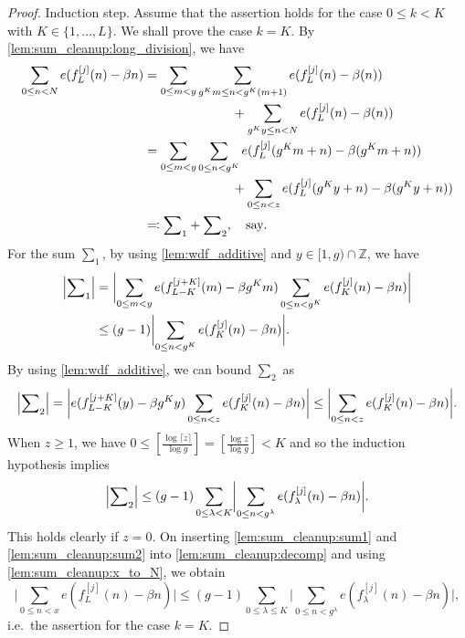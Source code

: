 \documentclass[hidelinks]{amsart}
\numberwithin{equation}{section}
\theoremstyle{plain}
\theoremstyle{definition}
\newcommand{\prooftitle}[1]{\noindent\textsf{#1}}
\begin{document}
\begin{proof}
\prooftitle{Induction step.}
Assume that the assertion holds for the case $0\le k<K$ with $K\in\{1,\ldots,L\}$.
We shall prove the case $k=K$.
By \cref{lem:sum_cleanup:long_division}, we have
\begin{equation}
\label{lem:sum_cleanup:decomp}
\begin{aligned}
\sum_{0\le n<N}
e(f_{L}^{[j]}(n)-\beta n)
&=
\sum_{0\le m<y}
\sum_{g^{K}m\le n<g^{K}(m+1)}
e(f_{L}^{[j]}(n)-\beta(n))\\
&\hspace{0.2\textwidth}
+
\sum_{g^{K}y\le n<N}
e(f_{L}^{[j]}(n)-\beta(n))\\
&=
\sum_{0\le m<y}
\sum_{0\le n<g^{K}}
e(f_{L}^{[j]}(g^{K}m+n)-\beta(g^{K}m+n))\\
&\hspace{0.2\textwidth}
+
\sum_{0\le n<z}
e(f_{L}^{[j]}(g^{K}y+n)-\beta(g^{K}y+n))\\
&\eqqcolon
{\sum}_{1}+{\sum}_{2},\quad\text{say}.
\end{aligned}
\end{equation}
For the sum ${\sum}_{1}$, by using \cref{lem:wdf_additive} and $y\in[1,g)\cap\mathbb{Z}$, we have
\begin{align}
\label{lem:sum_cleanup:sum1}
\Bigl|
{\sum}_{1}
\Bigr|
&=
\biggl|
\sum_{0\le m<y}
e(f_{L-K}^{[j+K]}(m)-\beta g^{K}m)
\sum_{0\le n<g^{K}}
e(f_{K}^{[j]}(n)-\beta n)
\biggr|\\
&\le
(g-1)
\biggl|
\sum_{0\le n<g^{K}}
e(f_{K}^{[j]}(n)-\beta n)
\biggr|.
\end{align}
By using \cref{lem:wdf_additive}, we can bound ${\sum}_{2}$ as
\[
\Bigl|{\sum}_{2}\Bigr|
=
\biggl|
e(f_{L-K}^{[j+K]}(y)-\beta g^{K}y)
\sum_{0\le n<z}
e(f_{K}^{[j]}(n)-\beta n)
\biggr|
\le
\biggl|
\sum_{0\le n<z}
e(f_{K}^{[j]}(n)-\beta n)
\biggr|.
\]
When $z\ge1$, we have
$0\le[\frac{\log\lceil z\rceil}{\log g}]=[\frac{\log z}{\log g}]<K$
and so the induction hypothesis implies
\begin{equation}
\label{lem:sum_cleanup:sum2}
\Bigl|{\sum}_{2}\Bigr|
\le
(g-1)
\sum_{0\le\lambda<K}
\biggl|
\sum_{0\le n<g^{\lambda}}
e(f_{\lambda}^{[j]}(n)-\beta n)
\biggr|.
\end{equation}
This holds clearly if $z=0$.
On inserting \cref{lem:sum_cleanup:sum1} and \cref{lem:sum_cleanup:sum2} into \cref{lem:sum_cleanup:decomp}
and using \cref{lem:sum_cleanup:x_to_N}, we obtain
\[
\biggl|
\sum_{0\le n<x}
e(f_{L}^{[j]}(n)-\beta n)
\biggr|
\le
(g-1)
\sum_{0\le\lambda\le K}
\biggl|
\sum_{0\le n<g^{\lambda}}
e(f_{\lambda}^{[j]}(n)-\beta n)
\biggr|,
\]
i.e.\ the assertion for the case $k=K$.
\end{proof}
\end{document}
